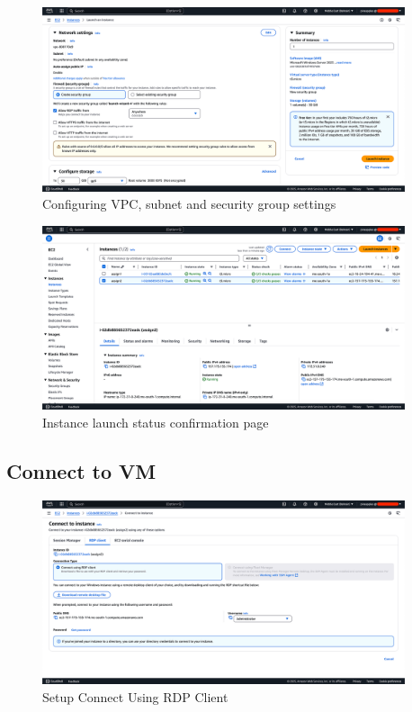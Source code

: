 \documentclass[a4paper,12pt]{article}
\begin{document}
\begin{figure}[H]
    \centering
    \includegraphics[width=0.95\textwidth]{create-windows-vm-3.png}
    \caption{Configuring VPC, subnet and security group settings}
    \label{fig:windows-vm3}
\end{figure}

\begin{figure}[H]
    \centering
    \includegraphics[width=0.95\textwidth]{create-windows-vm-4.png}
    \caption{Instance launch status confirmation page}
    \label{fig:windows-vm4}
\end{figure}

\subsection{Connect to VM}

\begin{figure}[H]
    \centering
    \includegraphics[width=0.95\textwidth]{connect-to-vm-1.png}
    \caption{Setup Connect Using RDP Client}
    \label{fig:connect1}
\end{figure}
\end{document}
